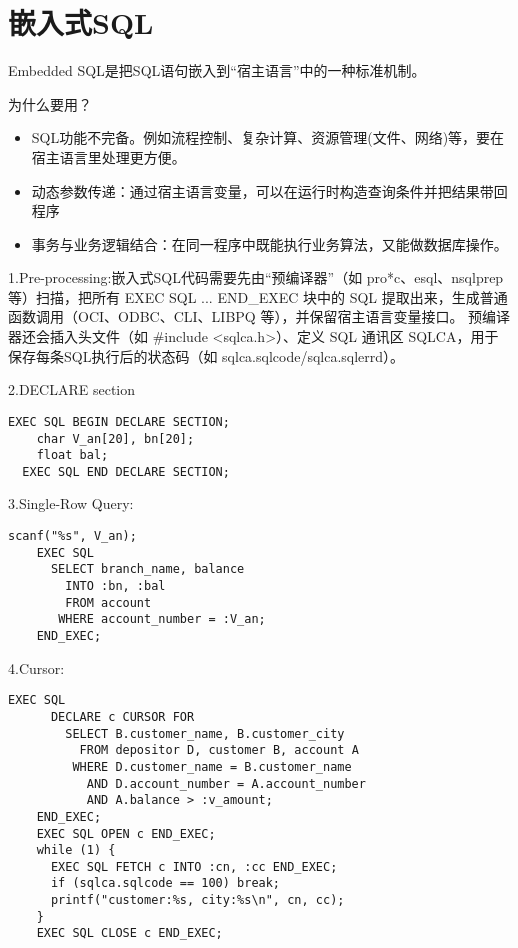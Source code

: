 \section{嵌入式SQL}

Embedded SQL是把SQL语句嵌入到“宿主语言”中的一种标准机制。

为什么要用？
\begin{itemize}
    \item SQL功能不完备。例如流程控制、复杂计算、资源管理(文件、网络)等，要在宿主语言里处理更方便。
    \item 动态参数传递：通过宿主语言变量，可以在运行时构造查询条件并把结果带回程序
    \item 事务与业务逻辑结合：在同一程序中既能执行业务算法，又能做数据库操作。
\end{itemize}

1.Pre-processing:嵌入式SQL代码需要先由“预编译器”（如 pro*c、esql、nsqlprep 等）扫描，把所有 EXEC SQL ... END\_EXEC 块中的 SQL 提取出来，生成普通函数调用（OCI、ODBC、CLI、LIBPQ 等），并保留宿主语言变量接口。
预编译器还会插入头文件（如 \#include <sqlca.h>）、定义 SQL 通讯区 SQLCA，用于保存每条SQL执行后的状态码（如 sqlca.sqlcode/sqlca.sqlerrd）。

2.DECLARE section
\begin{lstlisting}[style=cppstyle]
    EXEC SQL BEGIN DECLARE SECTION;
    char V_an[20], bn[20];
    float bal;
  EXEC SQL END DECLARE SECTION;
\end{lstlisting}

3.Single-Row Query:
\begin{lstlisting}[style=cppstyle]
    scanf("%s", V_an); 
    EXEC SQL
      SELECT branch_name, balance
        INTO :bn, :bal
        FROM account
       WHERE account_number = :V_an;
    END_EXEC;      
\end{lstlisting}

4.Cursor:
\begin{lstlisting}[style=cppstyle]
    EXEC SQL
      DECLARE c CURSOR FOR
        SELECT B.customer_name, B.customer_city
          FROM depositor D, customer B, account A
         WHERE D.customer_name = B.customer_name
           AND D.account_number = A.account_number
           AND A.balance > :v_amount;
    END_EXEC;
    EXEC SQL OPEN c END_EXEC;
    while (1) {
      EXEC SQL FETCH c INTO :cn, :cc END_EXEC;
      if (sqlca.sqlcode == 100) break; 
      printf("customer:%s, city:%s\n", cn, cc);
    }
    EXEC SQL CLOSE c END_EXEC;
       
\end{lstlisting}

